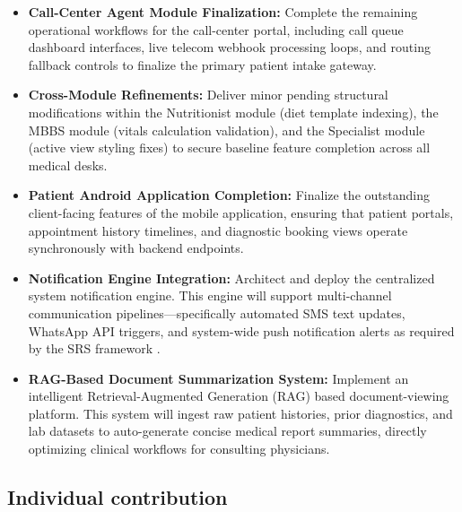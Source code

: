 \documentclass[onecolumn,journal]{IEEEtran}
\begin{document}
	\begin{itemize}
		\item \textbf{Call-Center Agent Module Finalization:} Complete the remaining operational workflows for the call-center portal, including call queue dashboard interfaces, live telecom webhook processing loops, and routing fallback controls to finalize the primary patient intake gateway.
		
		\item \textbf{Cross-Module Refinements:} Deliver minor pending structural modifications within the Nutritionist module (diet template indexing), the MBBS module (vitals calculation validation), and the Specialist module (active view styling fixes) to secure baseline feature completion across all medical desks.
		
		\item \textbf{Patient Android Application Completion:} Finalize the outstanding client-facing features of the mobile application, ensuring that patient portals, appointment history timelines, and diagnostic booking views operate synchronously with backend endpoints.
		
		\item \textbf{Notification Engine Integration:} Architect and deploy the centralized system notification engine. This engine will support multi-channel communication pipelines—specifically automated SMS text updates, WhatsApp API triggers, and system-wide push notification alerts as required by the SRS framework \cite{srs2026}.
		
		\item \textbf{RAG-Based Document Summarization System:} Implement an intelligent Retrieval-Augmented Generation (RAG) \cite{rag2020} based document-viewing platform. This system will ingest raw patient histories, prior diagnostics, and lab datasets to auto-generate concise medical report summaries, directly optimizing clinical workflows for consulting physicians.
	\end{itemize}
	
	\subsection{Individual contribution}
	
\end{document}
